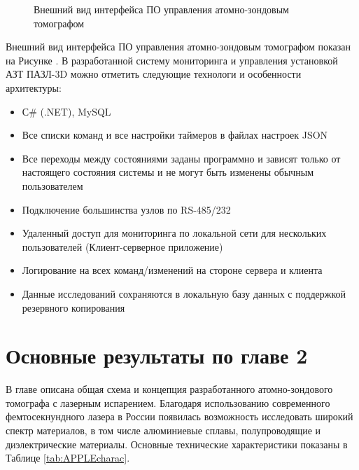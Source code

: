 \begin{figure}[htb]
	\caption{Внешний вид интерфейса ПО управления атомно-зондовым томографом}
	\label{fig:auto_APPLE_Jabber}
\end{figure}

Внешний вид интерфейса ПО управления атомно-зондовым томографом показан на Рисунке . В разработанной систему мониторинга и управления установкой АЗТ ПАЗЛ-3D можно отметить следующие  технологи и особенности архитектуры:

\begin{itemize}[beginpenalty=10000]
	\item С$\#$ (.NET), MySQL
	\item Все списки команд и все настройки таймеров в файлах настроек JSON
	\item Все переходы между состояниями заданы программно и зависят только от настоящего состояния системы и не могут быть изменены обычным пользователем
	\item Подключение большинства узлов по RS-485/232
	\item Удаленный доступ для мониторинга по локальной сети для нескольких пользователей (Клиент-серверное приложение)
	\item Логирование на всех команд/изменений на стороне сервера и клиента
	\item Данные исследований сохраняются в локальную базу данных с поддержкой резервного копирования
\end{itemize}


\FloatBarrier
\section{Основные результаты по главе 2}\label{sec:ch2/sec7}

В главе описана общая схема и концепция разработанного атомно-зондового томографа с лазерным испарением. Благодаря использованию современного фемтосекнундного лазера в России появилась возможность исследовать широкий спектр материалов, в том числе алюминиевые сплавы, полупроводящие и диэлектрические материалы. Основные технические характеристики показаны в Таблице \cref{tab:APPLEcharac}.


